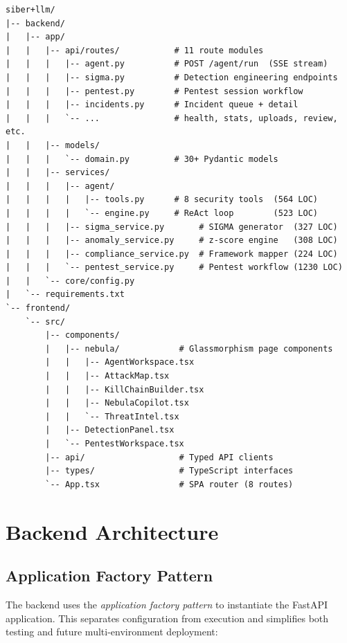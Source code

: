 \documentclass[12pt,a4paper]{article}
\begin{document}
\begin{lstlisting}[style=pythonstyle, caption=Annotated project directory tree]
siber+llm/
|-- backend/
|   |-- app/
|   |   |-- api/routes/           # 11 route modules
|   |   |   |-- agent.py          # POST /agent/run  (SSE stream)
|   |   |   |-- sigma.py          # Detection engineering endpoints
|   |   |   |-- pentest.py        # Pentest session workflow
|   |   |   |-- incidents.py      # Incident queue + detail
|   |   |   `-- ...               # health, stats, uploads, review, etc.
|   |   |-- models/
|   |   |   `-- domain.py         # 30+ Pydantic models
|   |   |-- services/
|   |   |   |-- agent/
|   |   |   |   |-- tools.py      # 8 security tools  (564 LOC)
|   |   |   |   `-- engine.py     # ReAct loop        (523 LOC)
|   |   |   |-- sigma_service.py       # SIGMA generator  (327 LOC)
|   |   |   |-- anomaly_service.py     # z-score engine   (308 LOC)
|   |   |   |-- compliance_service.py  # Framework mapper (224 LOC)
|   |   |   `-- pentest_service.py     # Pentest workflow (1230 LOC)
|   |   `-- core/config.py
|   `-- requirements.txt
`-- frontend/
    `-- src/
        |-- components/
        |   |-- nebula/            # Glassmorphism page components
        |   |   |-- AgentWorkspace.tsx
        |   |   |-- AttackMap.tsx
        |   |   |-- KillChainBuilder.tsx
        |   |   |-- NebulaCopilot.tsx
        |   |   `-- ThreatIntel.tsx
        |   |-- DetectionPanel.tsx
        |   `-- PentestWorkspace.tsx
        |-- api/                   # Typed API clients
        |-- types/                 # TypeScript interfaces
        `-- App.tsx                # SPA router (8 routes)
\end{lstlisting}

\section{Backend Architecture}

\subsection{Application Factory Pattern}

The backend uses the \emph{application factory pattern} to instantiate the FastAPI application.
This separates configuration from execution and simplifies both testing and future multi-environment
deployment:
\end{document}
